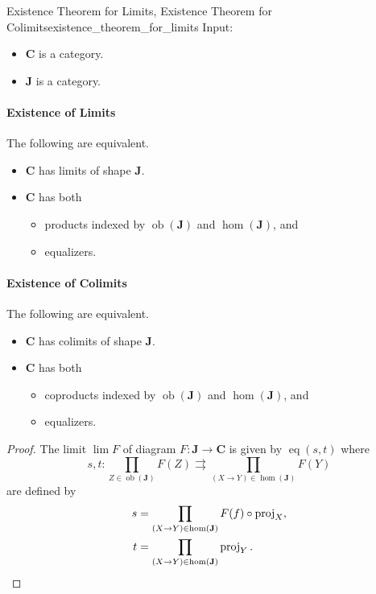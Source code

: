 \documentclass{article}
\begin{document}
\begin{theorem}{Existence Theorem for Limits, Existence Theorem for Colimits}{existence_theorem_for_limits}
    Input:
    \begin{itemize}
        \item $\mathbf{C}$ is a category.
        \item $\mathbf{J}$ is a category.
    \end{itemize}
    \paragraph*{Existence of Limits}
    The following are equivalent.
    \begin{itemize}
        \item $\mathbf{C}$ has limits of shape $\mathbf{J}$.
        \item $\mathbf{C}$ has both
        \begin{itemize}
            \item products indexed by $\operatorname{ob}(\mathbf{J})$ and $\operatorname{hom}(\mathbf{J})$, and
            \item equalizers.
        \end{itemize}
    \end{itemize}
    \tcblower
    \paragraph*{Existence of Colimits}
    The following are equivalent.
    \begin{itemize}
        \item $\mathbf{C}$ has colimits of shape $\mathbf{J}$.
        \item $\mathbf{C}$ has both
        \begin{itemize}
            \item coproducts indexed by $\operatorname{ob}(\mathbf{J})$ and $\operatorname{hom}(\mathbf{J})$, and
            \item equalizers.
        \end{itemize}
    \end{itemize}
\end{theorem}
\begin{proof}
    The limit $\lim F$ of diagram $F:\mathbf{J}\rightarrow \mathbf{C}$ is given by $\operatorname{eq}(s,t)$ where
    \[ s,t: \prod_{Z\in\operatorname{ob}(\mathbf{J})} F(Z) \rightrightarrows \prod_{(X\rightarrow Y)\in \operatorname{hom}(\mathbf{J})} F(Y) \]
    are defined by
    \begin{align*}
        s &= \prod_{(X\rightarrow Y)\in\operatorname{hom}(\mathbf{J})} F(f) \circ \operatorname{proj}_X, \\
        t &= \prod_{(X\rightarrow Y)\in\operatorname{hom}(\mathbf{J})} \operatorname{proj}_Y. \qedhere
    \end{align*}
\end{proof}
\end{document}
